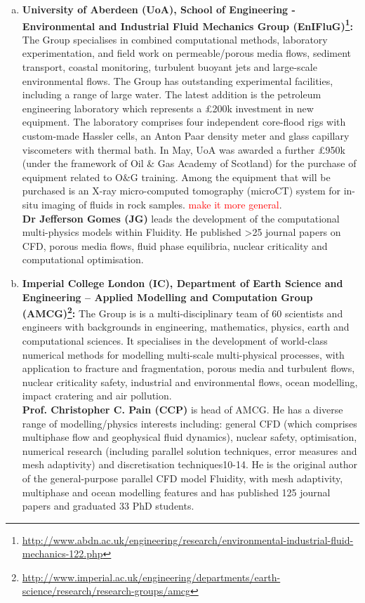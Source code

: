 \documentclass[12pts,a4paper,amsmath,amssymb,floatfix]{article}%
\newcommand{\red}{\textcolor{red}}
\begin{document}
\begin{enumerate}[(a)]
%
\item {\bf University of Aberdeen (UoA), School of Engineering - Environmental and Industrial Fluid Mechanics Group (EnIFluG)\footnote{\href{http://www.abdn.ac.uk/engineering/research/environmental-industrial-fluid-mechanics-122.php}{http://www.abdn.ac.uk/engineering/research/environmental-industrial-fluid-mechanics-122.php}}:} The Group specialises in combined computational methods, laboratory experimentation, and field work on permeable/porous media flows, sediment transport, coastal monitoring, turbulent buoyant jets and large-scale environmental flows. The Group has outstanding experimental facilities, including a range of large water. The latest addition is the petroleum engineering laboratory which represents a \pounds 200k investment in new equipment. The laboratory comprises four independent core-flood rigs with custom-made Hassler cells, an Anton Paar density meter and glass capillary viscometers with thermal bath. In May, UoA was awarded a further \pounds 950k (under the framework of Oil $\&$ Gas Academy of Scotland) for the purchase of equipment related to O$\&$G training. Among the equipment that will be purchased is an X-ray micro-computed tomography (microCT) system for in-situ imaging of fluids in rock samples. \red{make it more general}. \\
{\bf Dr Jefferson Gomes (JG)} leads the development of the computational multi-physics models within Fluidity. He published >25 journal papers on CFD, porous media flows, fluid phase equilibria, nuclear criticality and computational optimisation.

%
\item {\bf Imperial College London (IC), Department of Earth Science and Engineering – Applied Modelling and Computation Group (AMCG)\footnote{\href{http://www.imperial.ac.uk/engineering/departments/earth-science/research/research-groups/amcg}{http://www.imperial.ac.uk/engineering/departments/earth-science/research/research-groups/amcg}}:} The Group is is a multi-disciplinary team of 60 scientists and engineers with backgrounds in engineering, mathematics, physics, earth and computational sciences. It specialises in the development of world-class numerical methods for modelling multi-scale multi-physical processes, with application to fracture and fragmentation, porous media and turbulent flows, nuclear criticality safety, industrial and environmental flows, ocean modelling, impact cratering and air pollution. \\
{\bf Prof. Christopher C. Pain (CCP)} is head of AMCG. He has a diverse range of modelling/physics interests including: general CFD (which comprises multiphase flow and geophysical fluid dynamics), nuclear safety, optimisation, numerical research (including parallel solution techniques, error measures and mesh adaptivity) and discretisation techniques10-14. He is the original author of the general-purpose parallel CFD model Fluidity, with mesh adaptivity, multiphase and ocean modelling features and has published 125 journal papers and graduated 33 PhD students. 
%
\end{enumerate}
\end{document}

